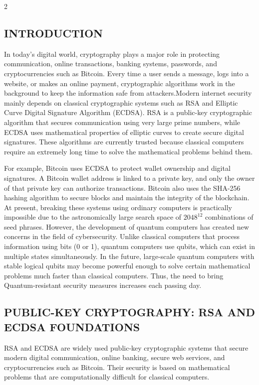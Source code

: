\begin{multicols}{2}
  \subsection*{\centering\uppercase{INTRODUCTION}}
  In today’s digital world, cryptography plays a major role in protecting communication, online transactions,
  banking systems, passwords, and cryptocurrencies such as Bitcoin. Every time a user sends a message, logs into
  a website, or makes an online payment, cryptographic algorithms work in the background to keep the
  information safe from attackers.Modern internet security mainly depends on classical cryptographic systems
  such as RSA and Elliptic Curve Digital Signature Algorithm (ECDSA). RSA is a public-key cryptographic
  algorithm that secures communication using very large prime numbers, while ECDSA uses mathematical
  properties of elliptic curves to create secure digital signatures. These algorithms are currently trusted because
  classical computers require an extremely long time to solve the mathematical problems behind them.

  \noindent
  For example, Bitcoin uses ECDSA to protect wallet ownership and digital signatures. A Bitcoin wallet address
  is linked to a private key, and only the owner of that private key can authorize transactions. Bitcoin also uses the
  SHA-256 hashing algorithm to secure blocks and maintain the integrity of the blockchain. At present, breaking
  these systems using ordinary computers is practically impossible due to the astronomically large search space of
  \(2048^{12}\) combinations of seed phrases. However, the development of quantum computers has created new
  concerns in the field of cybersecurity. Unlike classical computers that process information using bits (0 or 1),
  quantum computers use qubits, which can exist in multiple states simultaneously. In the future, large-scale
  quantum computers with stable logical qubits may become powerful enough to solve certain mathematical
  problems much faster than classical computers. Thus, the need to bring Quantum-resistant security measures
  increases each passing day.

  \subsection*{\centering\uppercase{Public-Key Cryptography: RSA and ECDSA Foundations}}
  RSA and ECDSA are widely used public-key cryptographic systems that secure modern digital
  communication, online banking, secure web services, and cryptocurrencies such as Bitcoin. Their
  security is based on mathematical problems that are computationally difficult for classical computers.


\end{multicols}
